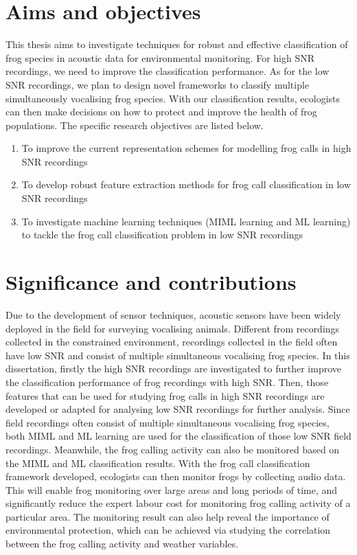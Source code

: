 \section{Aims and objectives}
This thesis aims to investigate techniques for robust and effective classification of frog species in acoustic data for environmental monitoring. For high SNR recordings, we need to improve the classification performance. As for the low SNR recordings, we plan to design novel frameworks to classify multiple simultaneously vocalising frog species. With our classification results, ecologists can then make decisions on how to protect and improve the health of frog populations. The specific research objectives are listed below.


\begin{enumerate}

\item	To improve the current representation schemes for modelling frog calls in high SNR recordings

\item 	To develop robust feature extraction methods for frog call classification in low SNR recordings 

\item   To investigate machine learning techniques (MIML learning and ML learning) to tackle the frog call classification problem in low SNR recordings

\end{enumerate}
 
 
 
\section{Significance and contributions}
Due to the development of sensor techniques, acoustic sensors have been widely deployed in the field for surveying vocalising animals. Different from recordings collected in the constrained environment, recordings collected in the field often have low SNR and consist of multiple simultaneous vocalising frog species. In this dissertation, firstly the high SNR recordings are investigated to further improve the classification performance of frog recordings with high SNR. 
Then, those features that can be used for studying frog calls in high SNR recordings are developed or adapted for analysing low SNR recordings for further analysis.
Since field recordings often consist of multiple simultaneous vocalising frog species, both MIML and ML learning are used for the classification of those low SNR field recordings. Meanwhile, the frog calling activity can also be monitored based on the MIML and ML classification results.
With the frog call classification framework developed, ecologists can then monitor frogs by collecting audio data. This will enable frog monitoring over large areas and long periods of time, and significantly reduce the expert labour cost for monitoring frog calling activity of a particular area. The monitoring result can also help reveal the importance of environmental protection, which can be achieved via studying the correlation between the frog calling activity and weather variables. 

